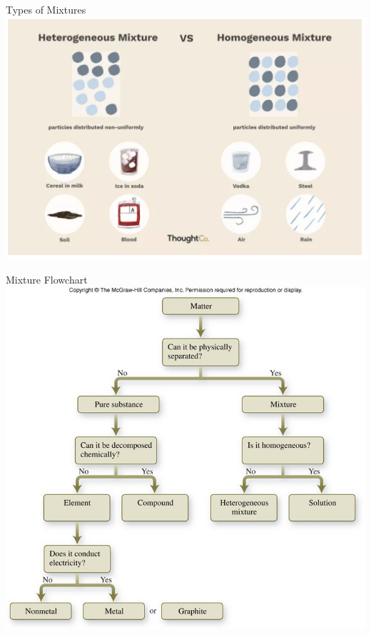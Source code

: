 \documentclass[11pt]{beamer}
\begin{document}
\begin{frame}{Types of Mixtures}
  \centering
  \includegraphics[width=\linewidth]{mixtures}
\end{frame}

\begin{frame}{Mixture Flowchart}
  \centering
  \includegraphics[width=0.8\linewidth]{mix_flowchart}
\end{frame}
\end{document}
